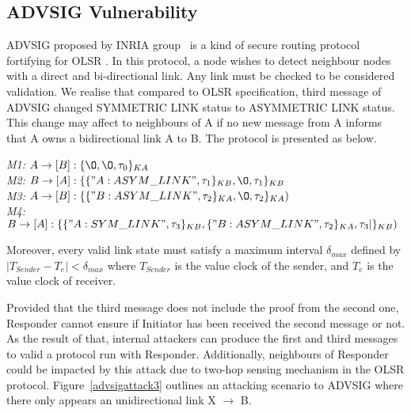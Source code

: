 \subsection{ADVSIG Vulnerability}

ADVSIG proposed by INRIA group~\cite{Raffo:2004:ASS:1029102.1029106} is a kind of secure routing protocol fortifying for OLSR \cite{Clausen:2003:OLS:RFC3626}. In this protocol, a node wishes to detect neighbour nodes with a direct and bi-directional link. Any link must be checked to be considered validation. We realise that compared to OLSR specification, third message of ADVSIG changed SYMMETRIC LINK status to ASYMMETRIC LINK status. This change may affect to neighbours of A if no new message from A informs that A owns a bidirectional link A to B. The protocol is presented as below. 
\begin{flushleft}
 \emph{M1:} $A \to [B]: \{\O, \O, \tau_0\}_{KA}$\\
 \emph{M2:} $B \to [A]: \{\{"A:ASYM\_LINK", \tau_1\}_{KB}, \O,\tau_1\}_{KB}$\\
\emph{M3:} $A \to [B]: \{\{"B:ASYM\_LINK",\tau_2\}_{KA},\O ,\tau_2 \}_{KA})$\\
 \emph{M4:} $B \to [A] : \{\{"A:SYM\_LINK", \tau_3\}_{KB} ,\{"B:ASYM\_LINK",\tau_2\}_{KA} ,\tau_3|\}_{KB})$
\end{flushleft}

Moreover, every valid link state must satisfy a maximum interval $\delta_{max}$ defined by $|T_{Sender} - T_e | < \delta_{max}$ where $T_{Sender}$ is the value clock of the sender, and $T_e$ is the value clock of receiver. 

Provided that the third message does not include the proof from the second one, Responder cannot ensure if Initiator has been received the second message or not. As the result of that, internal attackers can produce the first and third messages to valid a protocol run with Responder. Additionally,  neighbours of Responder could be impacted by this attack due to two-hop sensing mechanism in the OLSR protocol.  Figure~\ref{advsigattack3} outlines an attacking scenario to ADVSIG where there only appears an unidirectional link X $\rightarrow$ B.

